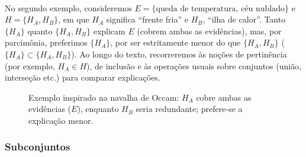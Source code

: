 \documentclass[12pt,a4paper]{article}
\def\\{}%
\def\emph#1{#1}%
\def\_{}%
\begin{document}
\paragraph{}
No segundo exemplo, consideremos \(E=\{\text{queda de temperatura},\, \text{céu nublado}\}\) e \(H=\{H_A, H_B\}\), em que \(H_A\) significa “frente fria” e \(H_B\), “ilha de calor”. Tanto \(\{H_A\}\) quanto \(\{H_A,H_B\}\) explicam \(E\) (cobrem ambas as evidências), mas, por parcimônia, preferimos \(\{H_A\}\), por ser estritamente menor do que \(\{H_A,H_B\}\) (\(\{H_A\} \subset \{H_A,H_B\}\)). Ao longo do texto, recorreremos às noções de pertinência (por exemplo, \(H_A\in H\)), de inclusão e às operações usuais sobre conjuntos (união, interseção etc.) para comparar explicações.

 \begin{figure}[htbp]
        \centering
    \caption{\texorpdfstring{Exemplo inspirado na navalha de Occam: $H_A$ cobre ambas as evidências ($E$), enquanto $H_B$ seria redundante; prefere-se a explicação menor.}{Exemplo inspirado na navalha de Occam}}
        \label{fig:occam-exemplo}
    \end{figure}

\paragraph{}    
\subsubsection{Subconjuntos}
\end{document}
